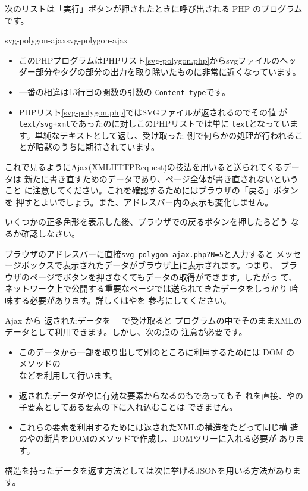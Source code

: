 次のリストは「実行」ボタンが押されたときに呼び出される PHP のプログラム
です。%

    {svg-polygon-ajax}{svg-polygon-ajax}
\begin{itemize}
 \item このPHPプログラムはPHPリスト\ref{svg-polygon.php}からsvgファイルのヘッ
ダー部分やタグの部分の出力を取り除いたものに非常に近くなっています。
 \item 一番の相違は13行目の関数の引数の
       \texttt{Content-type}です。
 \item PHPリスト\ref{svg-polygon.php}ではSVGファイルが返されるのでその値
       が\texttt{text/svg+xml}であったのに対しこのPHPリストでは単に
       \texttt{text}となっています。単純なテキストとして返し、受け取った
       側で何らかの処理が行われることが暗黙のうちに期待されています。
\end{itemize}

これで見るようにAjax(XMLHTTPRequest)の技法を用いると送られてくるデータは
  新たに書き直すためのデータであり、ページ全体が書き直されないということ
  に注意してください。これを確認するためにはブラウザの「戻る」ボタンを
  押すとよいでしょう。また、アドレスバー内の表示も変化しません。
\begin{Problem}\upshape
 いくつかの正多角形を表示した後、ブラウザでの戻るボタンを押したらどう
 なるか確認しなさい。

\iffalse
同様のことを \keyitem{Google Map}でも行いなさい。特に、検索をした後どう
 なるかを調べなさい。
\fi
\end{Problem}
ブラウザのアドレスバーに直接\verb+svg-polygon-ajax.php?N=5+と入力すると
メッセージボックスで表示されたデータがブラウザ上に表示されます。つまり、
ブラウザのページでボタンを押さなくてもデータの取得ができます。したがっ
て、ネットワーク上で公開する重要なページでは送られてきたデータをしっかり
吟味する必要があります。詳しくは\cite{PHPSecurity}や\cite{WebSecurity}を
参考にしてください。

Ajax から 返されたデータを 　で受け取ると
プログラムの中でそのままXMLのデータとして利用できます。しかし、次の点の
注意が必要です。
\begin{itemize}
 \item このデータから一部を取り出して別のところに利用するためには DOM の
       メソッドの\\などを利用して行います。
 \item 返されたデータが\SVG や\HTML に有効な要素からなるのもであってもそ
       れを直接、\SVG や\HTML の子要素としてある要素の下に入れ込むことは
       できません。
 \item これらの要素を利用するためには返されたXMLの構造をたどって同じ構
造の\SVG や\HTML の断片をDOMのメソッドで作成し、DOMツリーに入れる必要が
       あります。
\end{itemize}
構造を持ったデータを返す方法としては次に挙げるJSONを用いる方法があります。
\iffalse
